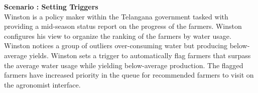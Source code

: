 \begin{flushleft}
\textbf{Scenario : Setting Triggers}\\\smallskip
Winston is a policy maker within the Telangana government tasked with providing a mid-season status report on the progress of the farmers. Winston configures his view to organize the ranking of the farmers by water usage. Winston notices a group of outliers over-consuming water but producing below-average yields. Winston sets a trigger to automatically flag farmers that surpass the average water usage while yielding below-average production. The flagged farmers have increased priority in the queue for recommended farmers to visit on the agronomist interface. 
\end{flushleft}
